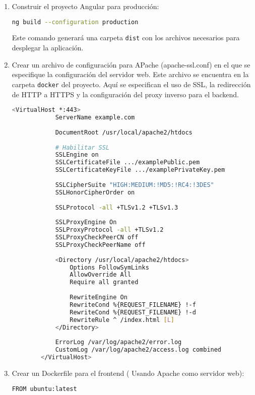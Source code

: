 \begin{enumerate}
    \item Construir el proyecto Angular para producción:
    \begin{lstlisting}[language=bash]
        ng build --configuration production
    \end{lstlisting}
    Este comando generará una carpeta \texttt{dist} con los archivos necesarios para desplegar la aplicación.
    \item Crear un archivo de configuración para APache (apache-ssl.conf) en el que se especifique la configuración del servidor web. Este archivo se encuentra en la carpeta \texttt{docker} del proyecto.
          Aquí se especifican el uso de SSL, la redirección de HTTP a HTTPS y la configuración del proxy inverso para el backend.
        \begin{lstlisting}[language=bash]
            <VirtualHost *:443>
            ServerName example.com
        
            DocumentRoot /usr/local/apache2/htdocs
        
            # Habilitar SSL
            SSLEngine on
            SSLCertificateFile .../examplePublic.pem
            SSLCertificateKeyFile .../examplePrivateKey.pem
        
            SSLCipherSuite "HIGH:MEDIUM:!MD5:!RC4:!3DES"
            SSLHonorCipherOrder on
        
            SSLProtocol -all +TLSv1.2 +TLSv1.3
        
            SSLProxyEngine On
            SSLProxyProtocol -all +TLSv1.2
            SSLProxyCheckPeerCN off
            SSLProxyCheckPeerName off
        
            <Directory /usr/local/apache2/htdocs>
                Options FollowSymLinks
                AllowOverride All
                Require all granted
        
                RewriteEngine On
                RewriteCond %{REQUEST_FILENAME} !-f
                RewriteCond %{REQUEST_FILENAME} !-d
                RewriteRule ^ /index.html [L]
            </Directory>
        
            ErrorLog /var/log/apache2/error.log
            CustomLog /var/log/apache2/access.log combined
        </VirtualHost>
        \end{lstlisting}
     
    \item Crear un Dockerfile para el frontend ( Usando Apache como servidor web):
        \begin{lstlisting}[language=bash]
            FROM ubuntu:latest


\end{lstlisting}
\end{enumerate}
